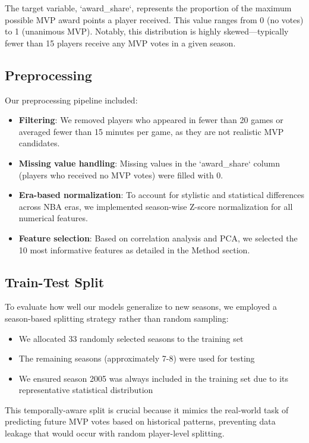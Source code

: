 \documentclass[10pt,twocolumn,letterpaper]{article}
\begin{document}
The target variable, `award_share`, represents the proportion of the maximum possible MVP award points a player received. This value ranges from 0 (no votes) to 1 (unanimous MVP). Notably, this distribution is highly skewed—typically fewer than 15 players receive any MVP votes in a given season.

\subsection{Preprocessing}

Our preprocessing pipeline included:

\begin{itemize}
    \item \textbf{Filtering}: We removed players who appeared in fewer than 20 games or averaged fewer than 15 minutes per game, as they are not realistic MVP candidates.
    \item \textbf{Missing value handling}: Missing values in the `award_share` column (players who received no MVP votes) were filled with 0.
    \item \textbf{Era-based normalization}: To account for stylistic and statistical differences across NBA eras, we implemented season-wise Z-score normalization for all numerical features.
    \item \textbf{Feature selection}: Based on correlation analysis and PCA, we selected the 10 most informative features as detailed in the Method section.
\end{itemize}

\subsection{Train-Test Split}

To evaluate how well our models generalize to new seasons, we employed a season-based splitting strategy rather than random sampling:

\begin{itemize}
    \item We allocated 33 randomly selected seasons to the training set
    \item The remaining seasons (approximately 7-8) were used for testing
    \item We ensured season 2005 was always included in the training set due to its representative statistical distribution
\end{itemize}

This temporally-aware split is crucial because it mimics the real-world task of predicting future MVP votes based on historical patterns, preventing data leakage that would occur with random player-level splitting.
\end{document}
